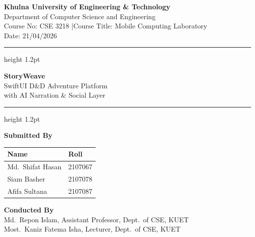 \documentclass[12pt,a4paper]{article}
\begin{document}
\begin{titlepage}
  \centering
  \vspace*{1.5cm}

  {\Large\bfseries Khulna University of Engineering \& Technology}\\[4pt]
  {\normalsize Department of Computer Science and Engineering}\\[2pt]
  {\normalsize Course No: CSE 3218 \quad|\quad Course Title: Mobile Computing Laboratory}\\[2pt]
  {\normalsize Date: 21/04/2026}

  \vspace{1.5cm}
  \hrule height 1.2pt
  \vspace{0.8cm}

  {\LARGE\bfseries StoryWeave}\\[6pt]
  {\large SwiftUI D\&D Adventure Platform\\with AI Narration \& Social Layer}

  \vspace{0.8cm}
  \hrule height 1.2pt
  \vspace{1.8cm}

  {\normalsize\bfseries Submitted By}\\[10pt]
  \begin{tabular}{ll}
    \toprule
    \textbf{Name}       & \textbf{Roll} \\
    \midrule
    Md.\ Shifat Hasan   & 2107067 \\
    Siam Basher         & 2107078 \\
    Afifa Sultana       & 2107087 \\
    \bottomrule
  \end{tabular}

  \vspace{1.8cm}

  {\normalsize\bfseries Conducted By}\\[8pt]
  {\normalsize Md.\ Repon Islam, Assistant Professor, Dept.\ of CSE, KUET}\\[4pt]
  {\normalsize Most.\ Kaniz Fatema Isha, Lecturer, Dept.\ of CSE, KUET}

  \vfill
\end{titlepage}

\tableofcontents
\newpage
\end{document}
